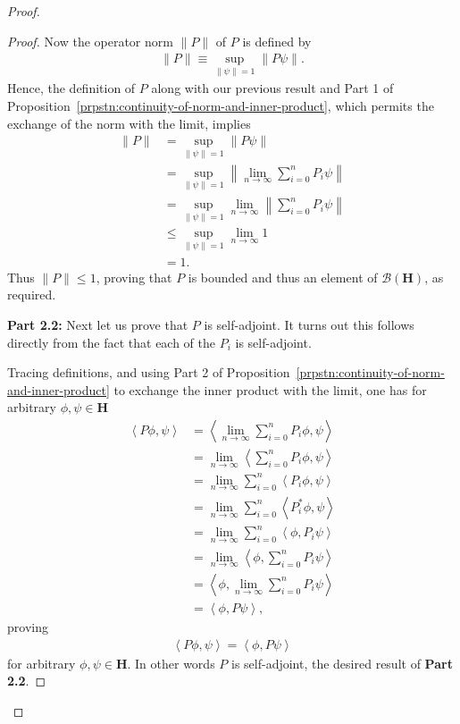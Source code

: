 \begin{proof}
\begin{proof}
Now the operator norm $\|P\|$ of $P$ is defined by
\begin{align}
    \|P\| \equiv \sup\limits_{\|\psi\| = 1} \|P\psi\|.
\end{align}
Hence, the definition of $P$ along with our previous result and Part 1 of Proposition~\ref{prpstn:continuity-of-norm-and-inner-product}, which permits the exchange of the norm with the limit, implies
\begin{align}
    \|P\| &=   \sup\limits_{\|\psi\| = 1} \left\|P\psi\right\| \\
          &=   \sup\limits_{\|\psi\| = 1} \left\|\lim\limits_{n \rightarrow \infty} \sum_{i = 0}^n P_i\psi\right\| \\
          &=   \sup\limits_{\|\psi\| = 1} \lim\limits_{n \rightarrow \infty} \left\|\sum_{i = 0}^n P_i\psi\right\| \\
          &\le \sup\limits_{\|\psi\| = 1} \lim\limits_{n \rightarrow \infty} 1 \\
          &=   1.
\end{align}
Thus $\|P\| \le 1$, proving that $P$ is bounded and thus an element of $\mathcal{B}(\mathbf{H})$, as required.

\textbf{Part 2.2:} Next let us prove that $P$ is self-adjoint. It turns out this follows directly from the fact that each of the $P_i$ is self-adjoint.

Tracing definitions, and using Part 2 of Proposition~\ref{prpstn:continuity-of-norm-and-inner-product} to exchange the inner product with the limit, one has for arbitrary $\phi, \psi \in \mathbf{H}$
\begin{align}
    \left< P\phi, \psi \right> &= \left< \lim\limits_{n \rightarrow \infty} \sum_{i = 0}^n P_i\phi, \psi \right> \\
                               &= \lim\limits_{n \rightarrow \infty} \left< \sum_{i = 0}^n P_i\phi, \psi \right> \\
                               &= \lim\limits_{n \rightarrow \infty} \sum_{i = 0}^n \left< P_i\phi, \psi \right> \\
                               &= \lim\limits_{n \rightarrow \infty} \sum_{i = 0}^n \left< P_i^*\phi, \psi \right> \\
                               &= \lim\limits_{n \rightarrow \infty} \sum_{i = 0}^n \left< \phi, P_i\psi \right> \\
                               &= \lim\limits_{n \rightarrow \infty} \left< \phi, \sum_{i = 0}^n P_i\psi \right> \\
                               &= \left< \phi, \lim\limits_{n \rightarrow \infty} \sum_{i = 0}^n P_i\psi \right> \\
                               &= \left< \phi, P\psi \right>,
\end{align}
proving
\begin{align}
    \left< P\phi, \psi \right> = \left< \phi, P\psi \right>
\end{align}
for arbitrary $\phi, \psi \in \mathbf{H}$. In other words $P$ is self-adjoint, the desired result of \textbf{Part 2.2}.


\end{proof}
\end{proof}
